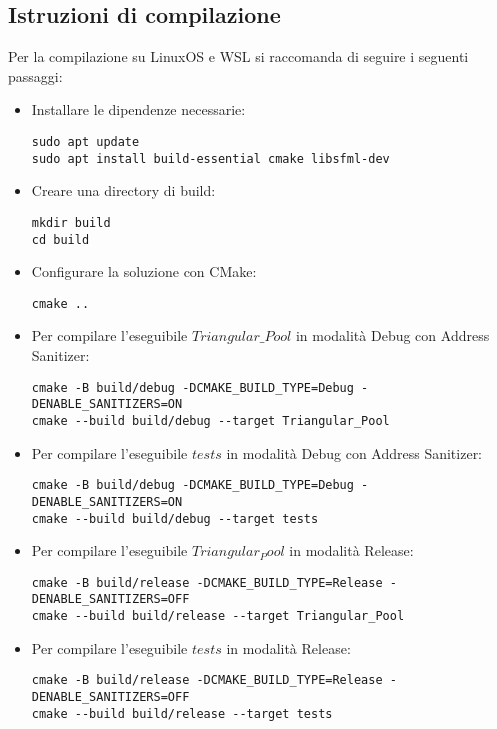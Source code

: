 \documentclass{article}
\begin{document}
\subsection{Istruzioni di compilazione}
Per la compilazione su LinuxOS e WSL si raccomanda di seguire i seguenti passaggi:


\begin{itemize}
    \item Installare le dipendenze necessarie:
    \begin{lstlisting}[style=wsl]
sudo apt update
sudo apt install build-essential cmake libsfml-dev
\end{lstlisting}

\item Creare una directory di build:
    \begin{lstlisting}[style=wsl]
mkdir build
cd build
\end{lstlisting}

\item Configurare la soluzione con CMake:
    \begin{lstlisting}[style=wsl]
cmake ..
\end{lstlisting}

\item Per compilare l'eseguibile $Triangular\_Pool$ in modalità Debug con Address Sanitizer:
    \begin{lstlisting}[style=wsl]
cmake -B build/debug -DCMAKE_BUILD_TYPE=Debug -DENABLE_SANITIZERS=ON
cmake --build build/debug --target Triangular_Pool
\end{lstlisting}

\item Per compilare l'eseguibile $tests$ in modalità Debug con Address Sanitizer:
    \begin{lstlisting}[style=wsl]
cmake -B build/debug -DCMAKE_BUILD_TYPE=Debug -DENABLE_SANITIZERS=ON
cmake --build build/debug --target tests
\end{lstlisting}

\item Per compilare l'eseguibile $Triangular_Pool$ in modalità Release:
    \begin{lstlisting}[style=wsl]
cmake -B build/release -DCMAKE_BUILD_TYPE=Release -DENABLE_SANITIZERS=OFF
cmake --build build/release --target Triangular_Pool
\end{lstlisting}


\item Per compilare l'eseguibile $tests$ in modalità Release:
    \begin{lstlisting}[style=wsl]
cmake -B build/release -DCMAKE_BUILD_TYPE=Release -DENABLE_SANITIZERS=OFF
cmake --build build/release --target tests
\end{lstlisting}





\end{itemize}
\end{document}
